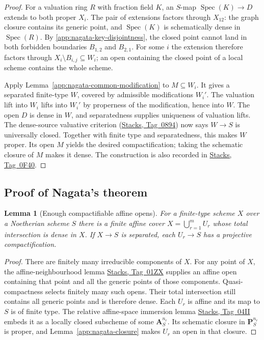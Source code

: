 \documentclass[11pt,a4paper]{article}
\numberwithin{equation}{section}
\newtheorem{lemma}[theorem]{Lemma}
\theoremstyle{definition}
\theoremstyle{remark}
\newcommand{\stacks}[1]{\href{https://stacks.math.columbia.edu/tag/#1}{\textnormal{Stacks, Tag~#1}}}
\begin{document}
\begin{proof}
For a valuation ring $R$ with fraction field $K$, an $S$-map
$\operatorname{Spec}(K)\to D$ extends to both proper $X_i$.
The pair of extensions factors through $X_{12}$: the graph
closure contains its generic point, and
$\operatorname{Spec}(K)$ is schematically dense in
$\operatorname{Spec}(R)$. By
\eqref{app:nagata-key-disjointness}, the closed point cannot land
in both forbidden boundaries $B_{1,2}$ and $B_{2,1}$.
For some $i$ the extension therefore factors through
$X_i\setminus B_{i,j}\subseteq W_i$; an open containing the closed
point of a local scheme contains the whole scheme.

Apply Lemma~\ref{app:nagata-common-modification} to $M\subseteq W_i$.
It gives a separated finite-type $W$, covered by admissible
modifications $W_i'$. The valuation lift into $W_i$ lifts into
$W_i'$ by properness of the modification, hence into $W$.
The open $D$ is dense in $W$, and separatedness supplies uniqueness
of valuation lifts. The dense-source valuative criterion
(\stacks{0894}) now says $W\to S$ is universally closed.
Together with finite type and separatedness, this makes $W$ proper.
Its open $M$ yields the desired compactification; taking the
schematic closure of $M$ makes it dense. The construction is also
recorded in \stacks{0F40}.
\end{proof}

\subsection{Proof of Nagata's theorem}
\label{app:nagata-global-proof}

\begin{lemma}[Enough compactifiable affine opens]
\label{app:nagata-affine-opens}
For a finite-type scheme $X$ over a Noetherian scheme $S$ there is
a finite affine cover $X=\bigcup_{r=1}^m U_r$ whose total
intersection is dense in $X$. If $X\to S$ is separated, each
$U_r\to S$ has a projective compactification.
\end{lemma}

\begin{proof}
There are finitely many irreducible components of $X$.
For any point of $X$, the affine-neighbourhood lemma
\stacks{01ZX} supplies an affine open containing that point and all
the generic points of those components. Quasi-compactness selects
finitely many such opens. Their total intersection still contains
all generic points and is therefore dense.
Each $U_r$ is affine and its map to $S$ is of finite type.
The relative affine-space immersion lemma \stacks{04II} embeds it
as a locally closed subscheme of some $\mathbf A^{n_r}_S$.
Its schematic closure in $\mathbf P^{n_r}_S$ is proper, and
Lemma~\ref{app:nagata-closure} makes $U_r$ an open in that closure.
\end{proof}
\end{document}
